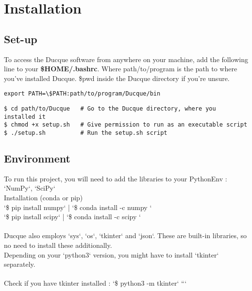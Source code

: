 
\pagebreak
\section{Installation}
\subsection{Set-up}
To access the Ducque software from anywhere on your machine, add the following line to your \textbf{\$HOME/.bashrc}.
Where path/to/program is the path to where you've installed Ducque. \$pwd inside the Ducque directory if you're unsure.
\begin{verbatim}
export PATH=\$PATH:path/to/program/Ducque/bin
\end{verbatim}

\begin{verbatim}
$ cd path/to/Ducque   # Go to the Ducque directory, where you installed it
$ chmod +x setup.sh   # Give permission to run as an executable script
$ ./setup.sh          # Run the setup.sh script
\end{verbatim}

\subsection{Environment}
To run this project, you will need to add the libraries to your PythonEnv : `NumPy`, `SciPy`\\
Installation (conda or pip)\\
`\$ pip install numpy` | `\$ conda install -c numpy `\\

`\$ pip install scipy` | `\$ conda install -c scipy `\\
\\
Ducque also employs `sys`, `os`, `tkinter` and `json`. These are built-in libraries, so no need to install these additionally.\\
Depending on your `python3` version, you might have to install `tkinter` separately.\\
\\
Check if you have tkinter installed : `\$ python3 -m tkinter`
```
